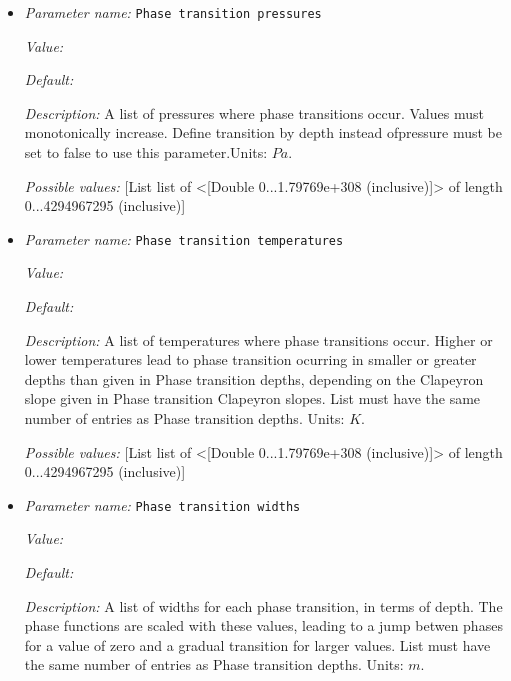 \begin{itemize}
{\it Possible values:} [List list of <[Double 0...1.79769e+308 (inclusive)]> of length 0...4294967295 (inclusive)]
\item {\it Parameter name:} {\tt Phase transition pressures}
\label{parameters:Material model/Latent heat/Phase transition pressures}


{\it Value:} 


{\it Default:} 


{\it Description:} A list of pressures where phase transitions occur. Values must monotonically increase. Define transition by depth instead ofpressure must be set to false to use this parameter.Units: $Pa$.


{\it Possible values:} [List list of <[Double 0...1.79769e+308 (inclusive)]> of length 0...4294967295 (inclusive)]
\item {\it Parameter name:} {\tt Phase transition temperatures}
\label{parameters:Material model/Latent heat/Phase transition temperatures}


{\it Value:} 


{\it Default:} 


{\it Description:} A list of temperatures where phase transitions occur. Higher or lower temperatures lead to phase transition ocurring in smaller or greater depths than given in Phase transition depths, depending on the Clapeyron slope given in Phase transition Clapeyron slopes. List must have the same number of entries as Phase transition depths. Units: $K$.


{\it Possible values:} [List list of <[Double 0...1.79769e+308 (inclusive)]> of length 0...4294967295 (inclusive)]
\item {\it Parameter name:} {\tt Phase transition widths}
\label{parameters:Material model/Latent heat/Phase transition widths}


{\it Value:} 


{\it Default:} 


{\it Description:} A list of widths for each phase transition, in terms of depth. The phase functions are scaled with these values, leading to a jump betwen phases for a value of zero and a gradual transition for larger values. List must have the same number of entries as Phase transition depths. Units: $m$.



\end{itemize}

